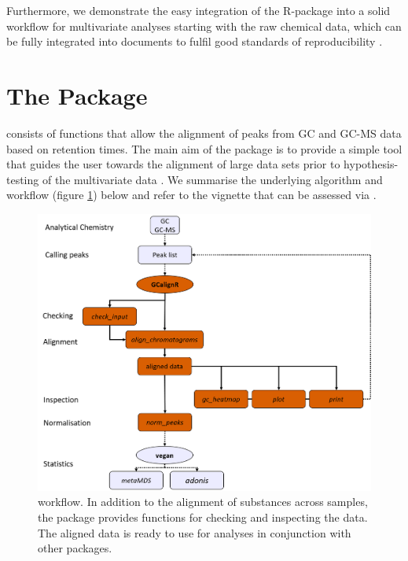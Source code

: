 Furthermore, we demonstrate the easy integration of the R-package \href{https://cran.r-project.org/web/packages/vegan/index.html}{} \citep{Oksanen.2016} into a solid workflow for multivariate analyses starting with the raw chemical data, which can be fully integrated into  documents \citep{Allaire.2016} to fulfil good standards of reproducibility \citep{Peng.2011}.

\section{The Package}
 consists of functions that allow the alignment of peaks from GC and GC-MS data based on retention times. The main aim of the package is to provide a simple tool that guides the user towards the alignment of large data sets prior to hypothesis-testing of the multivariate data \citep{Anderson.2001}. We summarise the underlying algorithm and workflow (figure \ref{figure:workflow}) below and refer to the vignette that can be assessed via .

\begin{figure}[htbp]
  \centering
  \includegraphics[width=13cm]{figures/workflow}
  \caption{ workflow. In addition to the alignment of substances across samples, the package provides functions for checking and inspecting the data. The aligned data is ready to use for analyses in conjunction with other packages.}
  \label{figure:workflow}
\end{figure}

